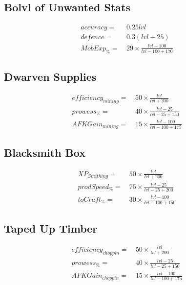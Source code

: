     \subsection{Bo{lvl} of Unwanted Stats}
        \begin{align*}
            accuracy= &\ 0.25{lvl}  
            \\
            defence= &\  0.3(lvl-25)
            \\
            MobExp_\% = &\  29 \times \frac{{lvl}-100}{{lvl}-100+170}
        \end{align*}
    \subsection{Dwarven Supplies}
        \begin{align*}
            efficiency_{mining} = &\   50 \times \frac{{lvl}}{{lvl}+200}
            \\
            prowess_\% = &\  40 \times \frac{{lvl}-25}{{lvl}-25+150}
            \\
            AFKGain_{mining} = &\  15 \times \frac{{lvl}-100}{{lvl}-100+175}
        \end{align*}

    \subsection{Blacksmith Box}
        \begin{align*}
            XP_{Smithing} = &\  50 \times \frac{{lvl}}{{lvl}+200}
            \\
            prodSpeed_\% = &\  75 \times \frac{{lvl}-25}{{lvl}-25+200}
            \\
            toCraft_\% = &\  30 \times \frac{{lvl}-100}{{lvl}-100+150}
        \end{align*}

    \subsection{Taped Up Timber}
        \begin{align*}
            efficiency_{choppin} = &\   50 \times \frac{{lvl}}{{lvl}+200}
            \\
            prowess_\% = &\  40 \times \frac{{lvl}-25}{{lvl}-25+150}
            \\
            AFKGain_{choppin}= &\  15 \times \frac{{lvl}-100}{{lvl}-100+175}
        \end{align*}


